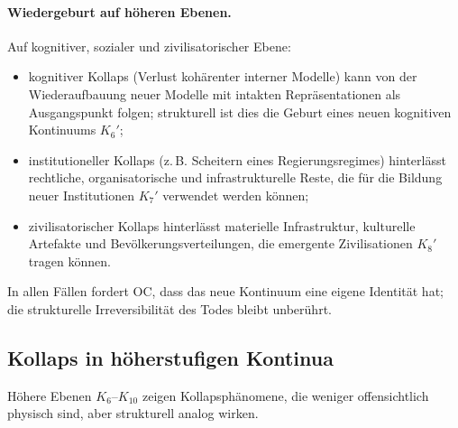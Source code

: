 \paragraph{Wiedergeburt auf höheren Ebenen.}
Auf kognitiver, sozialer und zivilisatorischer Ebene:
\begin{itemize}
  \item kognitiver Kollaps (Verlust kohärenter interner Modelle) kann von der
        Wiederaufbauung neuer Modelle mit intakten Repräsentationen als
        Ausgangspunkt folgen; strukturell ist dies die Geburt eines neuen
        kognitiven Kontinuums \(K_6'\);
  \item institutioneller Kollaps (z.\,B. Scheitern eines Regierungsregimes)
        hinterlässt rechtliche, organisatorische und infrastrukturelle Reste,
        die für die Bildung neuer Institutionen \(K_7'\) verwendet werden können;
  \item zivilisatorischer Kollaps hinterlässt materielle Infrastruktur,
        kulturelle Artefakte und Bevölkerungsverteilungen, die emergente
        Zivilisationen \(K_8'\) tragen können.
\end{itemize}

In allen Fällen fordert OC, dass das neue Kontinuum eine eigene Identität hat; die
strukturelle Irreversibilität des Todes bleibt unberührt.

\subsection{Kollaps in höherstufigen Kontinua}

Höhere Ebenen \(K_6\)–\(K_{10}\) zeigen Kollapsphänomene, die weniger
offensichtlich physisch sind, aber strukturell analog wirken.

